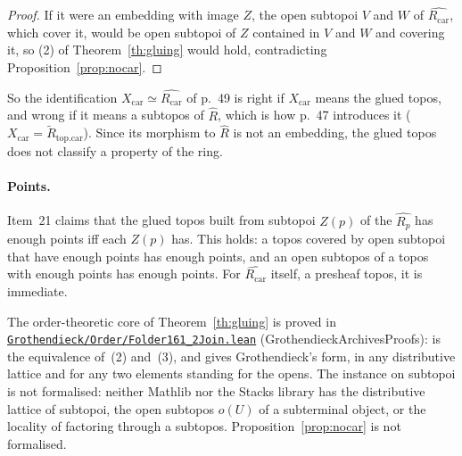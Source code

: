 \begin{proof}
If it were an embedding with image $Z$, the open subtopoi $V$ and $W$ of $\widehat{R_{\mathrm{car}}}$, which cover it, would be open subtopoi of $Z$ contained in $V$ and $W$ and covering it, so (2) of Theorem~\ref{th:gluing} would hold, contradicting Proposition~\ref{prop:nocar}.
\end{proof}

So the identification $X_{\mathrm{car}}\simeq\widehat{R_{\mathrm{car}}}$ of p.~49 is right if $X_{\mathrm{car}}$ means the glued topos, and wrong if it means a subtopos of $\widehat R$, which is how p.~47 introduces it ($X_{\mathrm{car}} = \widetilde R_{\mathrm{top.car}}$). Since its morphism to $\widehat R$ is not an embedding, the glued topos does not classify a property of the ring.

\paragraph{Points.} Item~21 claims that the glued topos built from subtopoi $Z(p)$ of the $\widehat{R_p}$ has enough points iff each $Z(p)$ has. This holds: a topos covered by open subtopoi that have enough points has enough points, and an open subtopos of a topos with enough points has enough points. For $\widehat{R_{\mathrm{car}}}$ itself, a presheaf topos, it is immediate.

\leanentry{} The order-theoretic core of Theorem~\ref{th:gluing} is proved in \href{https://github.com/Commutator-IO/GrothendieckArchivesProofs/blob/main/Grothendieck/Order/Folder161_2Join.lean}{\nolinkurl{Grothendieck/Order/Folder161\_2Join.lean}} (GrothendieckArchivesProofs):  is the equivalence of~(2) and~(3), and  gives Grothendieck's form, in any distributive lattice and for any two elements standing for the opens. The instance on subtopoi is not formalised: neither Mathlib nor the Stacks library has the distributive lattice of subtopoi, the open subtopos $o(U)$ of a subterminal object, or the locality of factoring through a subtopos. Proposition~\ref{prop:nocar} is not formalised.
